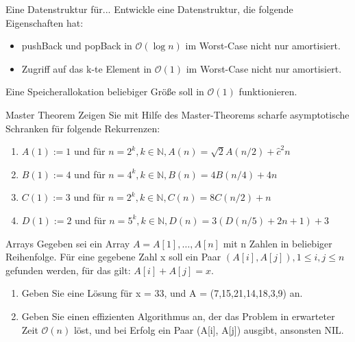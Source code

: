 \documentclass[18pt]{beamer}
\newcommand{\Oh}{\mathcal{O}}
\begin{document}
\begin{frame}{Eine Datenstruktur für...}
 Entwickle eine Datenstruktur, die folgende Eigenschaften hat:
 \begin{itemize}
  \item pushBack und popBack in $\Oh(\log n)$ im Worst-Case nicht nur amortisiert.
  \item Zugriff auf das k-te Element in $\Oh(1)$ im Worst-Case nicht nur amortisiert.
 \end{itemize}
Eine Speicherallokation beliebiger Größe soll in $\Oh(1)$ funktionieren.
\end{frame}

\begin{frame}{Master Theorem}
 Zeigen Sie mit Hilfe des Master-Theorems scharfe asymptotische Schranken für folgende Rekurrenzen:
 
 \begin{enumerate}[label=\alph* )]
  \item $A(1) := 1$ und für $n = 2^k, k \in \mathbb{N}, A(n) = \sqrt{2} A(n/2) + \hat{c}^2 n$
  \item $B(1) := 4$ und für $n = 4^k, k \in \mathbb{N}, B(n) = 4B(n/4) + 4n$
  \item $C(1) := 3$ und für $n = 2^k, k \in \mathbb{N}, C(n) = 8C(n/2) + n$
  \item $D(1) := 2$ und für $n = 5^k, k \in \mathbb{N}, D(n) = 3(D(n/5)+2n + 1) + 3$
 \end{enumerate}

\end{frame}

\begin{frame}{Arrays}
 Gegeben sei ein Array $A = A[1], \ldots, A[n]$ mit n Zahlen in beliebiger Reihenfolge.
 Für eine gegebene Zahl x soll ein Paar $(A[i], A[j]), 1 \leq i, j \leq n$ gefunden werden,
 für das gilt: $A[i] + A[j] = x$.
 
 \begin{enumerate}[label=\alph*)]
  \item Geben Sie eine Lösung für x = 33, und A = (7,15,21,14,18,3,9) an.
  \item Geben Sie einen effizienten Algorithmus an, der das Problem in erwarteter Zeit $\Oh(n)$
  löst, und bei Erfolg ein Paar (A[i], A[j]) ausgibt, ansonsten NIL.
 \end{enumerate}

\end{frame}
\end{document}
